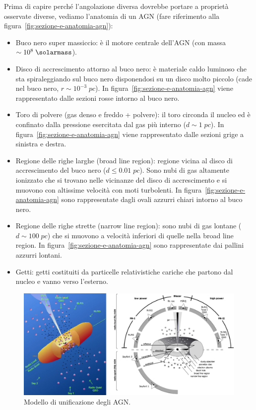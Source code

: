 Prima di capire perché l’angolazione diversa dovrebbe portare a proprietà osservate diverse, vediamo l’anatomia di un AGN (fare riferimento alla figura~\ref{fig:sezione-e-anatomia-agn}):
\begin{itemize}
    \item Buco nero super massiccio: è il motore centrale dell'AGN (con massa $\sim 10^8 \;\si{\solarmass}$).
    \item Disco di accrescimento attorno al buco nero: è materiale caldo luminoso che sta spiraleggiando sul buco nero disponendosi su un disco molto piccolo (cade nel buco nero, $r \sim 10^{-3} \;\si{pc}$). In figura~\ref{fig:sezione-e-anatomia-agn} viene rappresentato dalle sezioni rosse intorno al buco nero. 
    \item Toro di polvere (gas denso e freddo + polvere): il toro circonda il nucleo ed è confinato dalla pressione esercitata dal gas più interno ($d \sim 1 \;\si{pc}$). In figura~\ref{fig:sezione-e-anatomia-agn} viene rappresentato dalle sezioni grige a sinistra e destra.
    \item Regione delle righe larghe (broad line region): regione vicina al disco di accrescimento del buco nero ($d \leq 0.01 \;\si{pc}$). Sono nubi di gas altamente ionizzato che si trovano nelle vicinanze del disco di accrescimento e si muovono con altissime velocità con moti turbolenti. In figura~\ref{fig:sezione-e-anatomia-agn} sono rappresentate dagli ovali azzurri chiari intorno al buco nero. 
    \item Regione delle righe strette (narrow line region): sono nubi di gas lontane ($d \sim 100 \;\si{pc}$) che si muovono a velocità inferiori di quelle nella broad line region. In figura~\ref{fig:sezione-e-anatomia-agn} sono rappresentate dai pallini azzurri lontani. 
    \item Getti: getti costituiti da particelle relativistiche cariche che partono dal nucleo e vanno verso l’esterno.
\end{itemize}

\begin{figure}
    \centering
    \includegraphics[width = \textwidth]{immagini/modello-unificazione-agn.png}
    \caption{Modello di unificazione degli AGN.}
    \label{fig:modello-unificazione-agn}
\end{figure}

